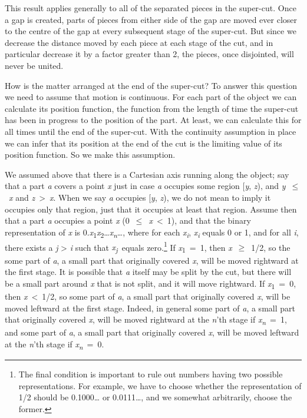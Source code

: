 This result applies generally to all of the separated pieces in the super-cut. Once a gap is created, parts of pieces from either side of the gap are moved ever closer to the centre of the gap at every subsequent stage of the super-cut. But since we decrease the distance moved by each piece at each stage of the cut, and in particular decrease it by a factor greater than 2, the pieces, once disjointed, will never be united.

How is the matter arranged at the end of the super-cut? To answer this question we need to assume that motion is continuous. For each part of the object we can calculate its position function, the function from the length of time the super-cut has been in progress to the position of the part. At least, we can calculate this for all times until the end of the super-cut. With the continuity assumption in place we can infer that its position at the end of the cut is the limiting value of its position function. So we make this assumption.

We assumed above that there is a Cartesian axis running along the object; say that a part \textit{a} covers a point \textit{x} just in case \textit{a} occupies some region [\textit{y}, \textit{z}), and \textit{y}~${\leq}$~\textit{x} and \textit{z}~{\textgreater}~\textit{x}. When we say \textit{a} occupies [\textit{y}, \textit{z}), we do not mean to imply it occupies only that region, just that it occupies at least that region. Assume then that a part \textit{a} occupies a point \textit{x} (0~${\leq}$~\textit{x}~{\textless}~1), and that the binary representation of \textit{x} is 0.\textit{x}\textsubscript{1}\textit{x}\textsubscript{2}{\dots}\textit{x}\textit{\textsubscript{n}}{\dots}, where for each \textit{x}\textit{\textsubscript{i}}, \textit{x}\textit{\textsubscript{i}} equals 0 or 1, and for all \textit{i}, there exists a \textit{j} {\textgreater} \textit{i} such that \textit{x}\textit{\textsubscript{j}}~equals zero.\footnote{The final condition is important to rule out numbers having two possible representations. For example, we have to choose whether the representation of 1/2 should be 0.1000{\dots} or 0.0111{\dots}, and we somewhat arbitrarily, choose the former.} If \textit{x}\textsubscript{1}~=~1, then \textit{x}~${\geq}$~1/2, so the some part of \textit{a}, a small part that originally covered \textit{x}, will be moved rightward at the first stage. It is possible that \textit{a} itself may be split by the cut, but there will be a small part around \textit{x} that is not split, and it will move rightward. If \textit{x}\textsubscript{1}~=~0, then \textit{x}~{\textless}~1/2, so some part of \textit{a}, a small part that originally covered \textit{x}, will be moved leftward at the first stage. Indeed, in general some part of \textit{a}, a small part that originally covered \textit{x}, will be moved rightward at the \textit{n}'th stage if \textit{x}\textit{\textsubscript{n}}~=~1, and some part of \textit{a}, a small part that originally covered \textit{x}, will be moved leftward at the \textit{n}'th stage if \textit{x}\textit{\textsubscript{n}}~=~0.

